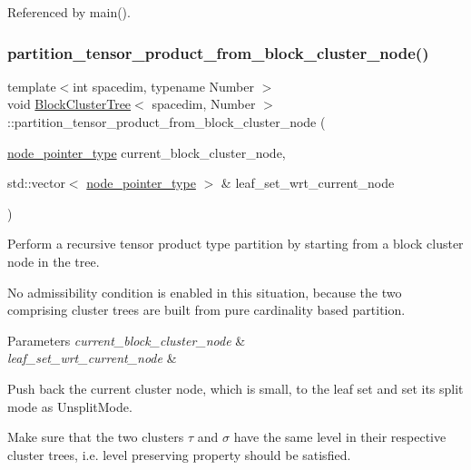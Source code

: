 Referenced by main().

\mbox{\label{classBlockClusterTree_ae77f8167ce49871f5751b8dcf8c93153}} 
\subsubsection{\texorpdfstring{partition\+\_\+tensor\+\_\+product\+\_\+from\+\_\+block\+\_\+cluster\+\_\+node()}{partition\_tensor\_product\_from\_block\_cluster\_node()}}
{\footnotesize\ttfamily template$<$int spacedim, typename Number $>$ \\
void \hyperlink{classBlockClusterTree}{Block\+Cluster\+Tree}$<$ spacedim, Number $>$\+::partition\+\_\+tensor\+\_\+product\+\_\+from\+\_\+block\+\_\+cluster\+\_\+node (\begin{DoxyParamCaption}\item[{\hyperlink{classTreeNode}{node\+\_\+pointer\+\_\+type}}]{current\+\_\+block\+\_\+cluster\+\_\+node,  }\item[{std\+::vector$<$ \hyperlink{classTreeNode}{node\+\_\+pointer\+\_\+type} $>$ \&}]{leaf\+\_\+set\+\_\+wrt\+\_\+current\+\_\+node }\end{DoxyParamCaption})\hspace{0.3cm}{\ttfamily [private]}}

Perform a recursive tensor product type partition by starting from a block cluster node in the tree.

No admissibility condition is enabled in this situation, because the two comprising cluster trees are built from pure cardinality based partition. 
\begin{DoxyParams}{Parameters}
{\em current\+\_\+block\+\_\+cluster\+\_\+node} & \\
\hline
{\em leaf\+\_\+set\+\_\+wrt\+\_\+current\+\_\+node} & \\
\hline
\end{DoxyParams}
Push back the current cluster node, which is small, to the leaf set and set its split mode as {\ttfamily Unsplit\+Mode}.

Make sure that the two clusters $\tau$ and $\sigma$ have the same level in their respective cluster trees, i.\+e. level preserving property should be satisfied.

